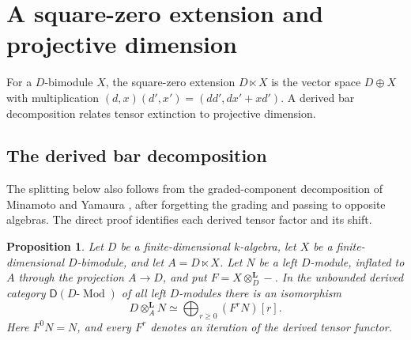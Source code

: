 \documentclass[11pt]{article}
\numberwithin{equation}{section}
\newtheorem{proposition}[theorem]{Proposition}
\theoremstyle{definition}
\theoremstyle{remark}
\newcommand{\D}{\mathsf D}
\newcommand{\otL}{\otimes^{\mathbf L}}
\DeclareMathOperator{\Mod}{Mod}
\begin{document}
\section{A square-zero extension and projective dimension}
\label{sec:square-zero}

For a $D$-bimodule $X$, the square-zero extension $D\ltimes X$
is the vector space $D\oplus X$ with multiplication
$(d,x)(d',x')=(dd',dx'+xd')$. A derived bar decomposition
relates tensor extinction to projective dimension.

\subsection{The derived bar decomposition}

The splitting below also follows from the graded-component decomposition
of Minamoto and Yamaura
\cite[Lemma~4.13(4) and the proof of Theorem~4.17]{MinamotoYamaura},
after forgetting the grading and passing to opposite algebras.
The direct proof identifies each derived tensor factor and its shift.

\begin{proposition}
\label{prop:bar-splitting}
Let \(D\) be a finite-dimensional \(k\)-algebra, let \(X\) be
a finite-dimensional \(D\)-bimodule, and let
\(A=D\ltimes X\).
Let \(N\) be a left \(D\)-module, inflated to \(A\) through
the projection \(A\to D\), and put \(F=X\otL_D-\).
In the unbounded derived category $\D(D\text{-}\Mod)$ of all left
$D$-modules there is an isomorphism
\begin{equation}
\label{eq:bar-splitting}
D\otL_A N
\simeq
\bigoplus_{r\ge0}(F^rN)[r].
\end{equation}
Here \(F^0N=N\), and every \(F^r\) denotes an iteration
of the derived tensor functor.
\end{proposition}
\end{document}
